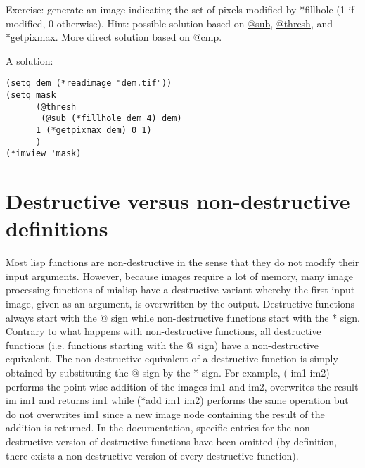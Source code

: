 \documentclass{book}
\makeatletter
\newcommand{\sref}[1]{\href{#1}{#1}}
\newcommand{\atcmp}{@cmp}
\newcommand{\atoverlay}{@overlay}
\newcommand{\atthresh}{@thresh}
\newcommand{\atsub}{@sub}
\newcommand{\starcrgbtorgb}{*crgb2rgb}
\newcommand{\stargetpixmax}{*getpixmax}
\makeatother
\begin{document}
Exercise: generate an image indicating the set of pixels modified by *fillhole (1 if modified, 0 otherwise).  Hint: possible solution based on \sref{\atsub}, \sref{\atthresh}, and \sref{\stargetpixmax}.  More direct solution based on \sref{\atcmp}.


A solution:
\begin{verbatim}
(setq dem (*readimage "dem.tif"))
(setq mask
      (@thresh
       (@sub (*fillhole dem 4) dem)
      1 (*getpixmax dem) 0 1)
      )
(*imview 'mask)
\end{verbatim}


\section{Destructive versus non-destructive definitions}
Most lisp functions are non-destructive in the sense that they do not modify their input arguments.  However, because images require a lot of memory, many image processing functions of mialisp have a destructive variant whereby the first input image, given as an argument, is overwritten by the output.  Destructive functions always start with the @ sign while non-destructive functions start with the * sign.  Contrary to what happens with non-destructive functions, all destructive functions (i.e. functions starting with the @ sign) have a non-destructive equivalent.
The non-destructive equivalent of a destructive function is simply obtained by substituting the @ sign by the * sign.  For example,  ( im1 im2) performs the point-wise addition of the images im1 and im2, overwrites the result im im1 and returns im1 while (*add im1 im2) performs the same operation but do not overwrites im1 since a new image node containing the result of the addition is returned.  In the documentation, specific entries for the non-destructive version of destructive functions have been omitted (by definition, there exists a non-destructive version of every destructive function).
\end{document}
